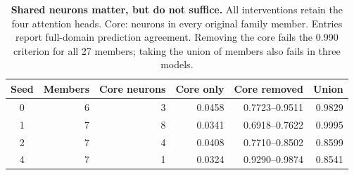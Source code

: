 \begin{table}[tb]\centering\small
\caption{\textbf{Shared neurons matter, but do not suffice.} All interventions retain the four attention heads. Core: neurons in every original family member. Entries report full-domain prediction agreement. Removing the core fails the 0.990 criterion for all 27 members; taking the union of members also fails in three models.}
\label{tab:core}
\begin{tabular}{crrrrr}\toprule
Seed & Members & Core neurons & Core only & Core removed & Union \\\midrule
0 & 6 & 3 & 0.0458 & 0.7723--0.9511 & 0.9829 \\
1 & 7 & 8 & 0.0341 & 0.6918--0.7622 & 0.9995 \\
2 & 7 & 4 & 0.0408 & 0.7710--0.8502 & 0.8599 \\
4 & 7 & 1 & 0.0324 & 0.9290--0.9874 & 0.8541 \\
\bottomrule\end{tabular}\end{table}

